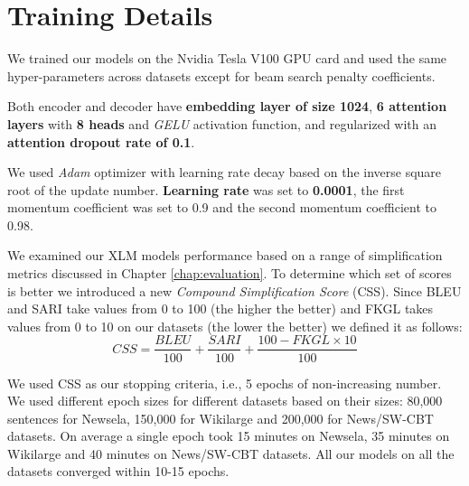 \section{Training Details}
\label{sec:training-details}

We trained our models on the Nvidia Tesla V100 GPU card and used the same hyper-parameters across datasets except for beam search penalty coefficients. 

Both encoder and decoder have \textbf{embedding layer of size 1024}, \textbf{6 attention layers} with \textbf{8 heads} and \textit{GELU} activation function, and regularized with an \textbf{attention dropout rate of 0.1}. 

We used \textit{Adam} optimizer with learning rate decay based on the inverse square root of the update number. \textbf{Learning rate} was set to \textbf{0.0001}, the first momentum coefficient was set to 0.9 and the second momentum coefficient to 0.98.

We examined our XLM models performance based on a range of simplification metrics discussed in Chapter \ref{chap:evaluation}. To determine which set of scores is better we introduced a new \emph{Compound Simplification Score} (CSS). Since BLEU and SARI take values from 0 to 100 (the higher the better) and FKGL takes values from 0 to 10 on our datasets (the lower the better) we defined it as follows:
\[CSS=\frac{BLEU}{100} + \frac{SARI}{100} + \frac{100 - FKGL \times 10}{100}\]

We used CSS as our stopping criteria, i.e., 5 epochs of non-increasing number. We used different epoch sizes for different datasets based on their sizes: 80,000 sentences for Newsela, 150,000 for Wikilarge and 200,000 for News/SW-CBT datasets. On average a single epoch took 15 minutes on Newsela, 35 minutes on Wikilarge and 40 minutes on News/SW-CBT datasets. All our models on all the datasets converged within 10-15 epochs.

\endinput